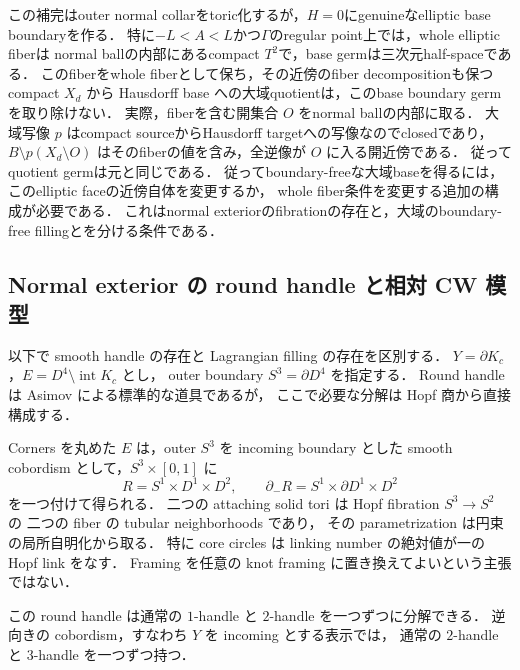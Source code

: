 \begin{remark}
\label{ncc:elliptic-face-limitation}
この補完はouter normal collarをtoric化するが，$H=0$にgenuineなelliptic base boundaryを作る．
特に$-L<A<L$かつ$\Gamma$のregular point上では，whole elliptic fiberは
normal ballの内部にあるcompact $T^2$で，base germは三次元half-spaceである．
このfiberをwhole fiberとして保ち，その近傍のfiber decompositionも保つ
compact $X_d$ から Hausdorff base への大域quotientは，このbase boundary germを取り除けない．
実際，fiberを含む開集合 $O$ をnormal ballの内部に取る．
大域写像 $p$ はcompact sourceからHausdorff targetへの写像なのでclosedであり，
$B\setminus p(X_d\setminus O)$ はそのfiberの値を含み，全逆像が $O$ に入る開近傍である．
従ってquotient germは元と同じである．
従ってboundary-freeな大域baseを得るには，このelliptic faceの近傍自体を変更するか，
whole fiber条件を変更する追加の構成が必要である．
これはnormal exteriorのfibrationの存在と，大域のboundary-free fillingとを分ける条件である．
\end{remark}

\subsection{Normal exterior の round handle と相対 CW 模型}
\label{tnc:relative-handles-section}

以下で smooth handle の存在と Lagrangian filling の存在を区別する．
$Y=\partial K_c$，$E=D^4\setminus\operatorname{int}K_c$ とし，
outer boundary $S^3=\partial D^4$ を指定する．
Round handle は Asimov \cite{asimov-round} による標準的な道具であるが，
ここで必要な分解は Hopf 商から直接構成する．

\begin{proposition}
\label{tnc:normal-round-handle}
Corners を丸めた $E$ は，outer $S^3$ を incoming boundary とした
smooth cobordism として，$S^3\times[0,1]$ に
\[
 R=S^1\times D^1\times D^2,
 \qquad \partial_-R=S^1\times\partial D^1\times D^2
\]
を一つ付けて得られる．
二つの attaching solid tori は Hopf fibration $S^3\to S^2$ の
二つの fiber の tubular neighborhoods であり，
その parametrization は円束の局所自明化から取る．
特に core circles は linking number の絶対値が一の Hopf link をなす．
Framing を任意の knot framing に置き換えてよいという主張ではない．

この round handle は通常の $1$-handle と $2$-handle を一つずつに分解できる．
逆向きの cobordism，すなわち $Y$ を incoming とする表示では，
通常の $2$-handle と $3$-handle を一つずつ持つ．
\end{proposition}

